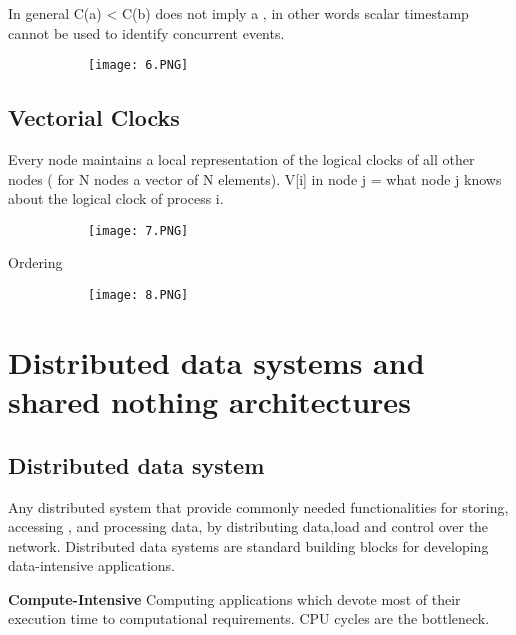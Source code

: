 \documentclass{article}
\begin{document}
In general C(a) < C(b) does not imply a , in other words scalar timestamp cannot be used to identify concurrent events.

\begin{figure}[ht!]
  \centering
  \begin{subfigure}[b]{0.3\linewidth}
    \texttt{[image: 6.PNG]}
  \end{subfigure}
\end{figure}

\subsection{Vectorial Clocks}
Every node maintains a local representation of the logical clocks of all other nodes ( for N nodes a vector of N elements). 
V[i] in node j = what node j knows about the logical clock of process i.

\begin{figure}[ht!]
  \centering
  \begin{subfigure}[b]{0.4\linewidth}
    \texttt{[image: 7.PNG]}
  \end{subfigure}
\end{figure}

Ordering

\begin{figure}[ht!]
  \centering
  \begin{subfigure}[b]{0.3\linewidth}
    \texttt{[image: 8.PNG]}
  \end{subfigure}
\end{figure}

\section{Distributed data systems and shared nothing architectures}

\subsection{Distributed data system}

Any distributed system that provide commonly needed functionalities for storing, accessing , and processing data, by distributing data,load and control over the network. Distributed data systems are standard building blocks for developing data-intensive applications.

\vspace{3mm}
\textbf{Compute-Intensive}
\vspace{2mm}
Computing applications which devote most of their execution time to computational requirements. CPU cycles are the bottleneck.
\end{document}
